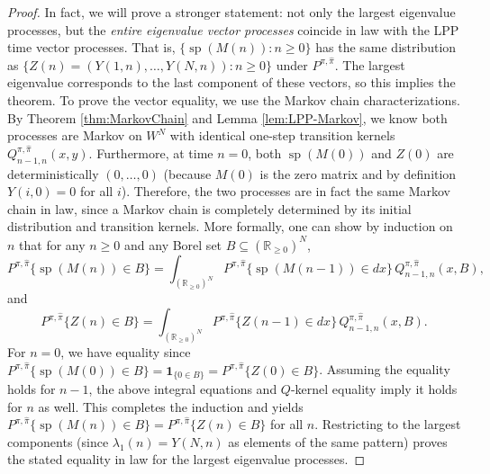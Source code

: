 \documentclass[letterpaper,11pt,oneside,reqno]{article}
\numberwithin{equation}{section}
\theoremstyle{definition}
\begin{document}
\begin{proof}
In fact, we will prove a stronger statement: not only the largest eigenvalue processes, but the \emph{entire eigenvalue vector processes} coincide in law with the LPP time vector processes. That is, $\{\operatorname{sp}(M(n)):n\ge0\}$ has the same distribution as $\{Z(n)=(Y(1,n),\dots,Y(N,n)):n\ge0\}$ under $P^{\pi,\hat\pi}$. The largest eigenvalue corresponds to the last component of these vectors, so this implies the theorem. To prove the vector equality, we use the Markov chain characterizations. By Theorem \ref{thm:MarkovChain} and Lemma \ref{lem:LPP-Markov}, we know both processes are Markov on $W^N$ with identical one-step transition kernels $Q^{\pi,\hat\pi}_{n-1,n}(x,y)$. Furthermore, at time $n=0$, both $\operatorname{sp}(M(0))$ and $Z(0)$ are deterministically $(0,\dots,0)$ (because $M(0)$ is the zero matrix and by definition $Y(i,0)=0$ for all $i$). Therefore, the two processes are in fact the same Markov chain in law, since a Markov chain is completely determined by its initial distribution and transition kernels. More formally, one can show by induction on $n$ that for any $n\ge0$ and any Borel set $B\subseteq ( \mathbb{R}_{\ge0})^N$,
\[
P^{\pi,\hat\pi}\{\operatorname{sp}(M(n))\in B\} = \int_{(\mathbb{R}_{\ge0})^N} P^{\pi,\hat\pi}\{\operatorname{sp}(M(n-1))\in dx\}\, Q^{\pi,\hat\pi}_{n-1,n}(x, B) ,
\]
and
\[
P^{\pi,\hat\pi}\{Z(n)\in B\} = \int_{(\mathbb{R}_{\ge0})^N} P^{\pi,\hat\pi}\{Z(n-1)\in dx\}\, Q^{\pi,\hat\pi}_{n-1,n}(x, B) .
\]
For $n=0$, we have equality since $P^{\pi,\hat\pi}\{\operatorname{sp}(M(0))\in B\} = \mathbf{1}_{\{0\in B\}} = P^{\pi,\hat\pi}\{Z(0)\in B\}$. Assuming the equality holds for $n-1$, the above integral equations and $Q$-kernel equality imply it holds for $n$ as well. This completes the induction and yields $P^{\pi,\hat\pi}\{\operatorname{sp}(M(n))\in B\} = P^{\pi,\hat\pi}\{Z(n)\in B\}$ for all $n$. Restricting to the largest components (since $\lambda_1(n)=Y(N,n)$ as elements of the same pattern) proves the stated equality in law for the largest eigenvalue processes.


\end{proof}
\end{document}
